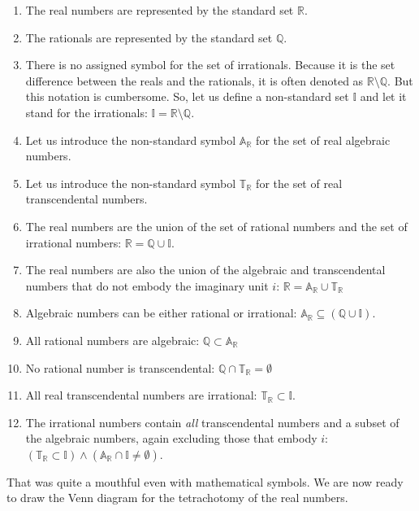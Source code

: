 \documentclass[
  a4paper,
]{article}
\begin{document}
\begin{enumerate}
\item
  The real numbers are represented by the standard set \(\mathbb{R}\).
\item
  The rationals are represented by the standard set \(\mathbb{Q}\).
\item
  There is no assigned symbol for the set of irrationals. Because it is
  the set difference between the reals and the rationals, it is often
  denoted as \(\mathbb{R}\setminus\mathbb{Q}\). But this notation is
  cumbersome. So, let us define a non-standard set \(\mathbb{I}\) and
  let it stand for the irrationals:
  \(\mathbb{I} = \mathbb{R}\setminus\mathbb{Q}\).
\item
  Let us introduce the non-standard symbol \(\mathbb{A_{\mathbb{R}}}\)
  for the set of real algebraic numbers.
\item
  Let us introduce the non-standard symbol \(\mathbb{T_{\mathbb{R}}}\)
  for the set of real transcendental numbers.
\item
  The real numbers are the union of the set of rational numbers and the
  set of irrational numbers:
  \(\mathbb{R} = \mathbb{Q} \cup \mathbb{I}\).
\item
  The real numbers are also the union of the algebraic and
  transcendental numbers that do not embody the imaginary unit \(i\):
  \(\mathbb{R} = \mathbb{A_{\mathbb{R}}} \cup \mathbb{T_{\mathbb{R}}}\)
\item
  Algebraic numbers can be either rational or irrational:
  \(\mathbb{A_{\mathbb{R}}} \subseteq (\mathbb{Q} \cup \mathbb{I})\).
\item
  All rational numbers are algebraic:
  \(\mathbb{Q} \subset \mathbb{A_{\mathbb{R}}}\)
\item
  No rational number is transcendental:
  \(\mathbb{Q} \cap \mathbb{T_{\mathbb{R}}} = \emptyset\)
\item
  All real transcendental numbers are irrational:
  \(\mathbb{T_{\mathbb{R}}} \subset \mathbb{I}\).
\item
  The irrational numbers contain \emph{all} transcendental numbers and a
  subset of the algebraic numbers, again excluding those that embody
  \(i\): \((\mathbb{T_{\mathbb{R}}} \subset \mathbb{I})
  \wedge (\mathbb{A}_{\mathbb{R}} \cap \mathbb{I} \neq \emptyset)\).
\end{enumerate}

That was quite a mouthful even with mathematical symbols. We are now
ready to draw the Venn diagram for the tetrachotomy of the real numbers.
\end{document}
